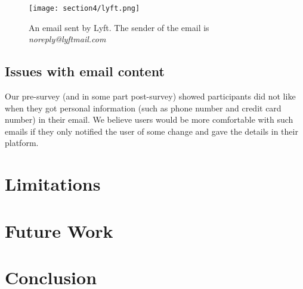 \begin{figure}
    \centering
    \texttt{[image: section4/lyft.png]}
    \caption[An email sent by Lyft]{An email sent by Lyft. The sender of the email is \textit{noreply@lyftmail.com}}
    \label{fig:lyft}
\end{figure}

\subsection{Issues with email content}
Our pre-survey (and in some part post-survey) showed participants did not like when they got personal information (such as phone number and credit card number) in their email. We believe users would be more comfortable with such emails if they only notified the user of some change and gave the details in their platform.

\section{Limitations}
\section{Future Work}
\section{Conclusion}